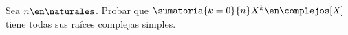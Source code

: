 \begin{enunciado}{\ejercicio}
  Sea $n \en \naturales$.
  Probar que $\sumatoria{k=0}{n}X^k \en \complejos[X]$ tiene todas sus raíces complejas simples.
\end{enunciado}

\hacer
